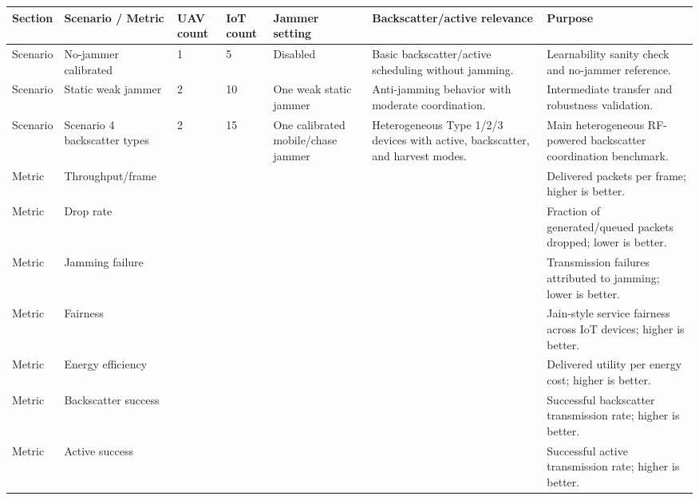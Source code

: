 \begin{tabular}{lllllll}
\hline
Section & Scenario / Metric & UAV count & IoT count & Jammer setting & Backscatter/active relevance & Purpose \\
\hline
Scenario & No-jammer calibrated & 1 & 5 & Disabled & Basic backscatter/active scheduling without jamming. & Learnability sanity check and no-jammer reference. \\
Scenario & Static weak jammer & 2 & 10 & One weak static jammer & Anti-jamming behavior with moderate coordination. & Intermediate transfer and robustness validation. \\
Scenario & Scenario 4 backscatter types & 2 & 15 & One calibrated mobile/chase jammer & Heterogeneous Type 1/2/3 devices with active, backscatter, and harvest modes. & Main heterogeneous RF-powered backscatter coordination benchmark. \\
Metric & Throughput/frame &  &  &  &  & Delivered packets per frame; higher is better. \\
Metric & Drop rate &  &  &  &  & Fraction of generated/queued packets dropped; lower is better. \\
Metric & Jamming failure &  &  &  &  & Transmission failures attributed to jamming; lower is better. \\
Metric & Fairness &  &  &  &  & Jain-style service fairness across IoT devices; higher is better. \\
Metric & Energy efficiency &  &  &  &  & Delivered utility per energy cost; higher is better. \\
Metric & Backscatter success &  &  &  &  & Successful backscatter transmission rate; higher is better. \\
Metric & Active success &  &  &  &  & Successful active transmission rate; higher is better. \\
\hline
\end{tabular}
